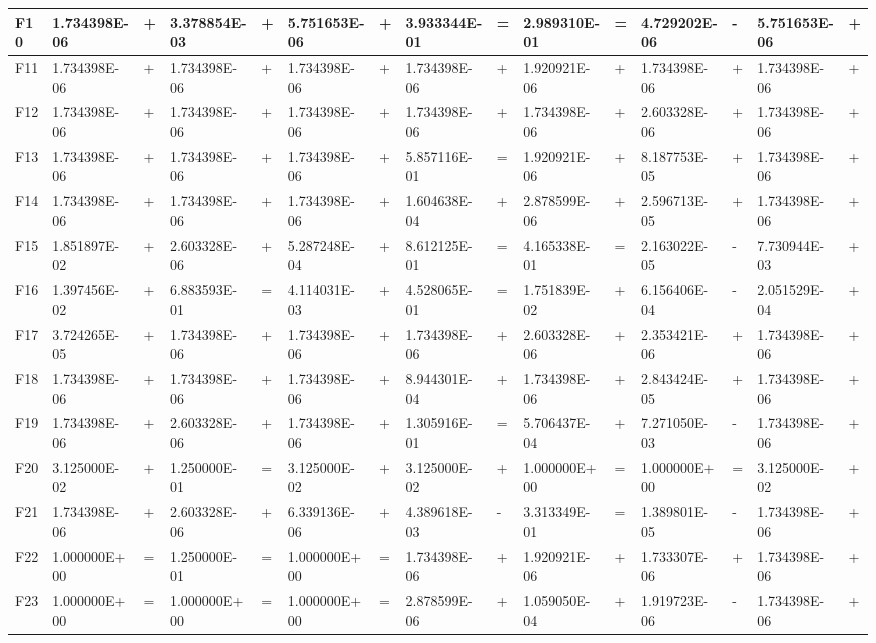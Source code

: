 \documentclass{article} %
\begin{document}
\begin{tabular}{|p{0.3in}|p{0.5in}|p{0.1in}|p{0.5in}|p{0.1in}|p{0.5in}|p{0.1in}|p{0.5in}|p{0.1in}|p{0.5in}|p{0.2in}|p{0.5in}|p{0.1in}|p{0.5in}|p{0.1in}|}
F10 & 1.734398E-06 & + & 3.378854E-03 & + & 5.751653E-06 & + & 3.933344E-01 & = & 2.989310E-01 & = & 4.729202E-06 & - & 5.751653E-06 & + \\ \hline 
F11 & 1.734398E-06 & + & 1.734398E-06 & + & 1.734398E-06 & + & 1.734398E-06 & + & 1.920921E-06 & + & 1.734398E-06 & + & 1.734398E-06 & + \\ \hline 
F12 & 1.734398E-06 & + & 1.734398E-06 & + & 1.734398E-06 & + & 1.734398E-06 & + & 1.734398E-06 & + & 2.603328E-06 & + & 1.734398E-06 & + \\ \hline 
F13 & 1.734398E-06 & + & 1.734398E-06 & + & 1.734398E-06 & + & 5.857116E-01 & = & 1.920921E-06 & + & 8.187753E-05 & + & 1.734398E-06 & + \\ \hline 
F14 & 1.734398E-06 & + & 1.734398E-06 & + & 1.734398E-06 & + & 1.604638E-04 & + & 2.878599E-06 & + & 2.596713E-05 & + & 1.734398E-06 & + \\ \hline 
F15 & 1.851897E-02 & + & 2.603328E-06 & + & 5.287248E-04 & + & 8.612125E-01 & = & 4.165338E-01 & = & 2.163022E-05 & - & 7.730944E-03 & + \\ \hline 
F16 & 1.397456E-02 & + & 6.883593E-01 & = & 4.114031E-03 & + & 4.528065E-01 & = & 1.751839E-02 & + & 6.156406E-04 & - & 2.051529E-04 & + \\ \hline 
F17 & 3.724265E-05 & + & 1.734398E-06 & + & 1.734398E-06 & + & 1.734398E-06 & + & 2.603328E-06 & + & 2.353421E-06 & + & 1.734398E-06 & + \\ \hline 
F18 & 1.734398E-06 & + & 1.734398E-06 & + & 1.734398E-06 & + & 8.944301E-04 & + & 1.734398E-06 & + & 2.843424E-05 & + & 1.734398E-06 & + \\ \hline 
F19 & 1.734398E-06 & + & 2.603328E-06 & + & 1.734398E-06 & + & 1.305916E-01 & = & 5.706437E-04 & + & 7.271050E-03 & - & 1.734398E-06 & + \\ \hline 
F20 & 3.125000E-02 & + & 1.250000E-01 & = & 3.125000E-02 & + & 3.125000E-02 & + & 1.000000E+00 & = & 1.000000E+00 & = & 3.125000E-02 & + \\ \hline 
F21 & 1.734398E-06 & + & 2.603328E-06 & + & 6.339136E-06 & + & 4.389618E-03 & - & 3.313349E-01 & = & 1.389801E-05 & - & 1.734398E-06 & + \\ \hline 
F22 & 1.000000E+00 & = & 1.250000E-01 & = & 1.000000E+00 & = & 1.734398E-06 & + & 1.920921E-06 & + & 1.733307E-06 & + & 1.734398E-06 & + \\ \hline 
F23 & 1.000000E+00 & = & 1.000000E+00 & = & 1.000000E+00 & = & 2.878599E-06 & + & 1.059050E-04 & + & 1.919723E-06 & - & 1.734398E-06 & + \\ \hline 

\end{tabular}
\end{document}

